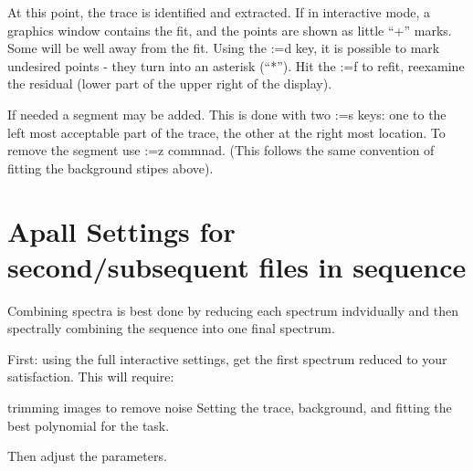 \documentclass[letter,11pt,oneside]{article}
\makeatletter
\newcommand\llbox[1]{%
  \@tfor\@ii:=#1\do{%
    {\color{verbcolor}\Ovalbox{\strut\@ii}}%
  }%
}
\newcommand{\dhl}[1]{{\color{verbcolor}{\texttt#1}}}
\makeatother
\begin{document}
At this point, the trace is identified and extracted. If in interactive mode,
a graphics window contains the fit, and the points are shown as little ``+''
marks. Some will be well away from the fit. Using the \llbox{d} key, it is
possible to mark undesired points - they turn into an asterisk (``*''). Hit
the \llbox{f} to refit, reexamine the residual (lower part of the upper right
of the display).

If needed a segment may be added. This is done with two \llbox{s} keys:
one to the left most acceptable part of the trace, the other at the right most
location. To remove the segment use \llbox{z} commnad. (This follows the same
convention of fitting the background stipes above).








\section{Apall Settings for second/subsequent files in sequence}

Combining spectra is best done by reducing each spectrum indvidually
and then spectrally combining \dhl{scombine} the sequence into one final
spectrum.

First: using the full interactive settings, get the first spectrum reduced
to your satisfaction. This will require:

trimming images to remove noise
Setting the trace, background, and fitting the best polynomial for the task.

Then adjust the parameters.
\end{document}
